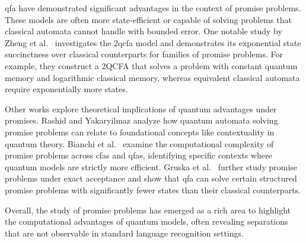 \gls{qfa} have demonstrated significant advantages in the context of promise problems. These models are often more state-efficient or capable of solving problems that classical automata cannot handle with bounded error. One notable study by Zheng et al.\ \cite{zheng2013state} investigates the \gls{2qcfa} model and demonstrates its exponential state succinctness over classical counterparts for families of promise problems. For example, they construct a 2QCFA that solves a problem with constant quantum memory and logarithmic classical memory, whereas equivalent classical automata require exponentially more states.

Other works explore theoretical implications of quantum advantages under promises. Rashid and Yakaryilmaz \cite{rashid2014implications} analyze how quantum automata solving promise problems can relate to foundational concepts like contextuality in quantum theory. Bianchi et al.\ \cite{bianchi2014complexity} examine the computational complexity of promise problems across \glspl{cfa} and \glspl{qfa}, identifying specific contexts where quantum models are strictly more efficient. Gruska et al.\ \cite{gruska2015potential} further study promise problems under exact acceptance and show that \gls{qfa} can solve certain structured promise problems with significantly fewer states than their classical counterparts.

Overall, the study of promise problems has emerged as a rich area to highlight the computational advantages of quantum models, often revealing separations that are not observable in standard language recognition settings.
